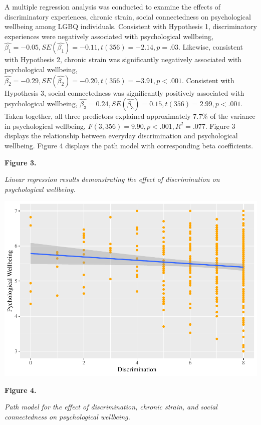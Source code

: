 \documentclass[
  english,
  man,floatsintext]{apa6}
\begin{document}
A multiple regression analysis was conducted to examine the effects of discriminatory experiences, chronic strain, social connectedness on psychological wellbeing among LGBQ individuals. Consistent with Hypothesis 1, discriminatory experiences were negatively associated with psychological wellbeing, \(\hat{\beta_{1}}=-0.05, SE(\hat{\beta_{1}})=-0.11, t(356)=-2.14, p=.03\). Likewise, consistent with Hypothesis 2, chronic strain was significantly negatively associated with psychological wellbeing, \(\hat{\beta_{2}}=-0.29, SE(\hat{\beta_{2}})=-0.20, t(356)=-3.91, p < .001\). Consistent with Hypothesis 3, social connectedness was significantly positively associated with psychological wellbeing, \(\hat{\beta_{3}}=0.24, SE(\hat{\beta_{3}})=0.15, t(356)=2.99, p < .001\). Taken together, all three predictors explained approximately 7.7\% of the variance in psychological wellbeing, \(F(3,356)=9.90, p<.001, R^{2}=.077\). Figure 3 displays the relationship between everyday discrimination and psychological wellbeing. Figure 4 displays the path model with corresponding beta coefficients.

\textbf{Figure 3.}

\emph{Linear regression results demonstrating the effect of discrimination on psychological wellbeing.}

\includegraphics{prep_script_files/figure-latex/regression plot-1.pdf}

\newpage

\textbf{Figure 4.}

\emph{Path model for the effect of discrimination, chronic strain, and social connectedness on psychological wellbeing.}

\hypertarget{htmlwidget-d9d800e45ebbfe8e0658}{}
\end{document}
